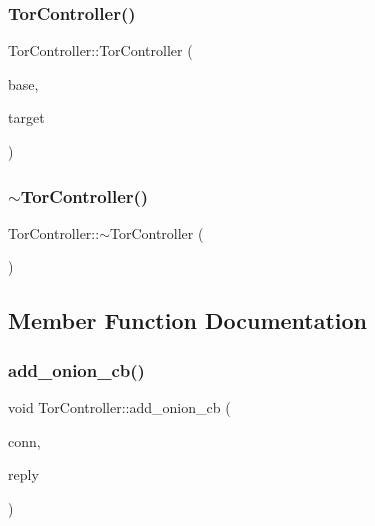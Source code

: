 \subsubsection{\texorpdfstring{Tor\+Controller()}{TorController()}}
{\footnotesize\ttfamily Tor\+Controller\+::\+Tor\+Controller (\begin{DoxyParamCaption}\item[{struct event\+\_\+base $\ast$}]{base,  }\item[{const std\+::string \&}]{target }\end{DoxyParamCaption})}

\mbox{\label{class_tor_controller_a98c6b822f4a60da7847a974607b95963}} 
\subsubsection{\texorpdfstring{$\sim$\+Tor\+Controller()}{~TorController()}}
{\footnotesize\ttfamily Tor\+Controller\+::$\sim$\+Tor\+Controller (\begin{DoxyParamCaption}{ }\end{DoxyParamCaption})}



\subsection{Member Function Documentation}
\mbox{\label{class_tor_controller_a78b762c14a006b2f509261a95963ff67}} 
\subsubsection{\texorpdfstring{add\+\_\+onion\+\_\+cb()}{add\_onion\_cb()}}
{\footnotesize\ttfamily void Tor\+Controller\+::add\+\_\+onion\+\_\+cb (\begin{DoxyParamCaption}\item[{\mbox{\hyperlink{class_tor_control_connection}{Tor\+Control\+Connection}} \&}]{conn,  }\item[{const \mbox{\hyperlink{class_tor_control_reply}{Tor\+Control\+Reply}} \&}]{reply }\end{DoxyParamCaption})\hspace{0.3cm}{\ttfamily [private]}}


